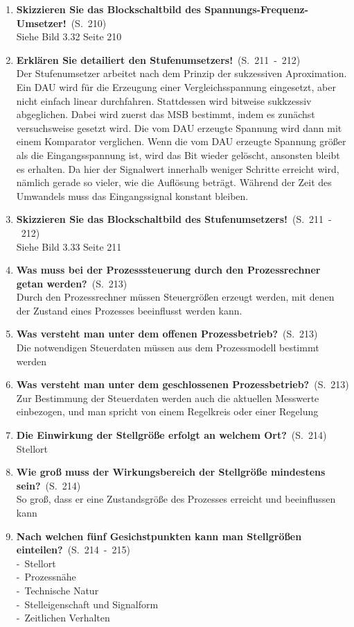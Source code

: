 \documentclass[a4paper,12pt]{article}
\newcommand{\question}[3]{\pagebreak[3]\item {\textbf{#1?}}\ (S.\ #2)#3}
\newcommand{\statement}[3]{\pagebreak[3]\item {\textbf{#1!}}\ (S.\ #2)#3}
\newcommand{\catchword}[1]{\\-\ #1}
\newcommand{\normaltext}[1]{\\#1}
\newcommand{\page}[1]{#1}
\newcommand{\pages}[2]{#1\ -\ #2}
\begin{document}
\begin{enumerate}
  \statement{Skizzieren Sie das Blockschaltbild des Spannungs-Frequenz-Umsetzer} {\page{210}}
  {
    \normaltext{Siehe Bild 3.32 Seite 210}
  }

  \statement{Erklären Sie detailiert den Stufenumsetzers}{\pages{211}{212}}
  {
    \normaltext{Der Stufenumsetzer arbeitet nach dem Prinzip der sukzessiven Aproximation. Ein DAU
                wird für die Erzeugung einer Vergleichsspannung eingesetzt, aber nicht einfach linear
                durchfahren. Stattdessen wird bitweise sukkzessiv abgeglichen. Dabei wird zuerst das
                MSB bestimmt, indem es zunächst versuchsweise gesetzt wird. Die vom DAU erzeugte
                Spannung wird dann mit einem Komparator verglichen. Wenn die vom DAU erzeugte Spannung
                größer als die Eingangsspannung ist, wird das Bit wieder gelöscht, ansonsten bleibt
                es erhalten. Da hier der Signalwert innerhalb weniger Schritte erreicht wird, nämlich
                gerade so vieler, wie die Auflösung beträgt. Während der Zeit des Umwandels muss das
                Eingangssignal konstant bleiben.}
  }

  \statement{Skizzieren Sie das Blockschaltbild des Stufenumsetzers} {\pages{211}{212}}
  {
    \normaltext{Siehe Bild 3.33 Seite 211}
  }

  \question{Was muss bei der Prozesssteuerung durch den Prozessrechner getan werden}{\page{213}}
  {
    \normaltext{Durch den Prozessrechner müssen Steuergrößen erzeugt werden, mit denen der Zustand
                eines Prozesses beeinflusst werden kann.}
  }

  \question{Was versteht man unter dem offenen Prozessbetrieb}{\page{213}}
  {
    \normaltext{Die notwendigen Steuerdaten müssen aus dem Prozessmodell bestimmt werden}
  }

  \question{Was versteht man unter dem geschlossenen Prozessbetrieb}{\page{213}}
  {
    \normaltext{Zur Bestimmung der Steuerdaten werden auch die aktuellen Messwerte einbezogen,
                und man spricht von einem Regelkreis oder einer Regelung}
  }

  \question{Die Einwirkung der Stellgröße erfolgt an welchem Ort}{\page{214}}
  {
    \normaltext{Stellort}
  }

  \question{Wie groß muss der Wirkungsbereich der Stellgröße mindestens sein}{\page{214}}
  {
    \normaltext{So groß, dass er eine Zustandsgröße des Prozesses erreicht und
                beeinflussen kann}
  }

  \question{Nach welchen fünf Gesichstpunkten kann man Stellgrößen einteilen}{\pages{214}{215}}
  {
    \catchword{Stellort}
    \catchword{Prozessnähe}
    \catchword{Technische Natur}
    \catchword{Stelleigenschaft und Signalform}
    \catchword{Zeitlichen Verhalten}
  }


\end{enumerate}
\end{document}
